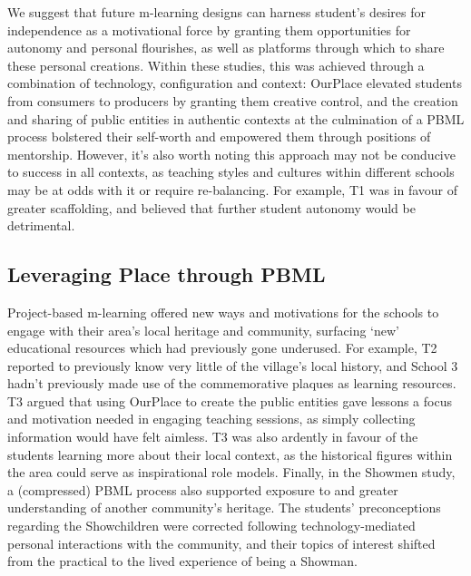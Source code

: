We suggest that future m-learning designs can harness student's desires for independence as a motivational force by granting them opportunities for autonomy and personal flourishes, as well as platforms through which to share these personal creations. Within these studies, this was achieved through a combination of technology, configuration and context: OurPlace elevated students from consumers to producers by granting them creative control, and the creation and sharing of public entities in authentic contexts at the culmination of a PBML process bolstered their self-worth and empowered them through positions of mentorship. However, it's also worth noting this approach may not be conducive to success in all contexts, as teaching styles and cultures within different schools may be at odds with it or require re-balancing. For example, T1 was in favour of greater scaffolding, and believed that further student autonomy would be detrimental. 


\subsection{Leveraging Place through PBML}
Project-based m-learning offered new ways and motivations for the schools to engage with their area's local heritage and community, surfacing `new' educational resources which had previously gone underused. For example, T2 reported to previously know very little of the village's local history, and School 3 hadn't previously made use of the commemorative plaques as learning resources. T3 argued that using OurPlace to create the public entities gave lessons a focus and motivation needed in engaging teaching sessions, as simply collecting information would have felt aimless. T3 was also ardently in favour of the students learning more about their local context, as the historical figures within the area could serve as inspirational role models. Finally, in the Showmen study, a (compressed) PBML process also supported exposure to and greater understanding of another community's heritage. The students' preconceptions regarding the Showchildren were corrected following technology-mediated personal interactions with the community, and their topics of interest shifted from the practical to the lived experience of being a Showman.

